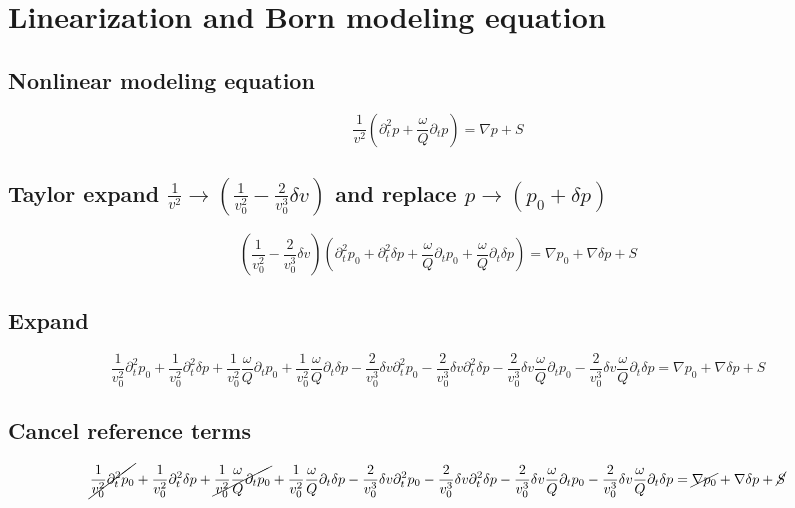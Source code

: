 \documentclass[10pt,fleqn]{article}
\begin{document}
\newpage
\section{Linearization and Born modeling equation}

\subsection{Nonlinear modeling equation}
\begin{equation}
\frac{1}{v^2} \left( \partial_t^2 p + \frac{\omega}{Q} \partial_t p \right) = \nabla p + S
\end{equation}

\subsection{Taylor expand $\displaystyle \frac{1}{v^2} \rightarrow \left( \frac{1}{v_0^2} - \frac{2}{v_0^3} \delta v \right) $
and replace $\displaystyle p \rightarrow \displaystyle (p_0 + \delta p)$}
\begin{equation}
\left( \frac{1}{v_0^2} - \frac{2}{v_0^3} \delta v \right) \left( \partial_t^2 p_0 + \partial_t^2 \delta p +
\frac{\omega}{Q} \partial_t p_0 + \frac{\omega}{Q} \partial_t \delta p \right) =
\nabla p_0 + \nabla \delta p + S
\end{equation}

\subsection{Expand}
\begin{equation}
  \frac{1}{v_0^2} \partial_t^2 p_0 
+ \frac{1}{v_0^2} \partial_t^2 \delta p
+ \frac{1}{v_0^2} \frac{\omega}{Q} \partial_t p_0 
+ \frac{1}{v_0^2} \frac{\omega}{Q} \partial_t \delta p
- \frac{2}{v_0^3} \delta v \partial_t^2 p_0
- \frac{2}{v_0^3} \delta v \partial_t^2 \delta p
- \frac{2}{v_0^3} \delta v \frac{\omega}{Q} \partial_t p_0
- \frac{2}{v_0^3} \delta v \frac{\omega}{Q} \partial_t \delta p
= \nabla p_0 + \nabla \delta p + S 
\end{equation}

\subsection{Cancel reference terms}
\begin{equation}
  \cancel{ \frac{1}{v_0^2} \partial_t^2 p_0 }
+ \frac{1}{v_0^2} \partial_t^2 \delta p
+ \cancel{ \frac{1}{v_0^2} \frac{\omega}{Q} \partial_t p_0 }
+ \frac{1}{v_0^2} \frac{\omega}{Q} \partial_t \delta p
- \frac{2}{v_0^3} \delta v \partial_t^2 p_0
- \frac{2}{v_0^3} \delta v \partial_t^2 \delta p 
- \frac{2}{v_0^3} \delta v \frac{\omega}{Q} \partial_t p_0
- \frac{2}{v_0^3} \delta v \frac{\omega}{Q} \partial_t \delta p 
= \cancel{ \nabla p_0 } + \nabla \delta p + \cancel{ S }
\end{equation}
\end{document}
